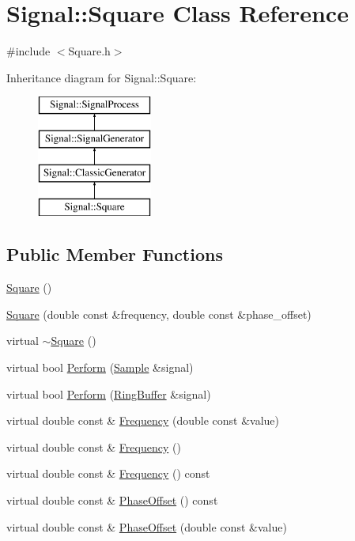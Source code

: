 \hypertarget{class_signal_1_1_square}{\section{Signal\+:\+:Square Class Reference}
\label{class_signal_1_1_square}
}


{\ttfamily \#include $<$Square.\+h$>$}

Inheritance diagram for Signal\+:\+:Square\+:\begin{figure}[H]
\begin{center}
\leavevmode
\includegraphics[height=4.000000cm]{class_signal_1_1_square}
\end{center}
\end{figure}
\subsection*{Public Member Functions}
\begin{DoxyCompactItemize}
\item 
\hyperlink{class_signal_1_1_square_a7f26603d620762e80c72de9750f6a7fc}{Square} ()
\item 
\hyperlink{class_signal_1_1_square_af0ead34823fa035db3aa1bcf39116a46}{Square} (double const \&frequency, double const \&phase\+\_\+offset)
\item 
virtual \hyperlink{class_signal_1_1_square_a2eda1d209b2c919a3ce4ff40f2f9fed4}{$\sim$\+Square} ()
\item 
virtual bool \hyperlink{class_signal_1_1_square_a584e1b867aed4cc4a808d8fb844387bc}{Perform} (\hyperlink{class_signal_1_1_sample}{Sample} \&signal)
\item 
virtual bool \hyperlink{class_signal_1_1_square_ab398eba1087030249d04f27a364f45ed}{Perform} (\hyperlink{class_signal_1_1_ring_buffer}{Ring\+Buffer} \&signal)
\item 
virtual double const \& \hyperlink{class_signal_1_1_square_a19f966d5b1800f5487cdd164747b21c0}{Frequency} (double const \&value)
\item 
virtual double const \& \hyperlink{class_signal_1_1_square_a49e8516818f89e05ad19dc09b2531e96}{Frequency} ()
\item 
virtual double const \& \hyperlink{class_signal_1_1_signal_generator_a96af42ee68f94e9b04d034fd68b73ecd}{Frequency} () const 
\item 
virtual double const \& \hyperlink{class_signal_1_1_signal_generator_ac2538ec946f001e394d2416fda698d1c}{Phase\+Offset} () const 
\item 
virtual double const \& \hyperlink{class_signal_1_1_signal_generator_ac6a103ff72beaa338f6d18c812522d78}{Phase\+Offset} (double const \&value)
\end{DoxyCompactItemize}
